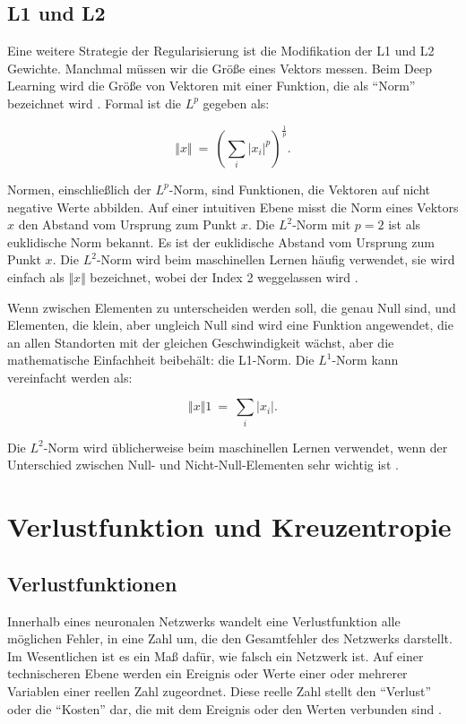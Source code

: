     \subsection{L1 und L2}
    Eine weitere Strategie der Regularisierung ist die Modifikation der L1 und L2 Gewichte. Manchmal müssen wir die Größe eines Vektors messen. Beim Deep Learning wird die Größe von Vektoren mit einer Funktion, die als \enquote{Norm} bezeichnet wird \cite*[39]{IanGoodfellowYoshuaBengio2016}. Formal ist die $L^p$ gegeben als:

    \begin{equation} \label{FormelNorm2}
      \Vert x\Vert \ =\ \left(\sum _{i}\bigr| x_{i}\bigr|^{p}\right)^{\frac{1}{p}}.
    \end{equation}

    Normen, einschließlich der $L^p$-Norm, sind Funktionen, die Vektoren auf nicht negative Werte abbilden. Auf einer intuitiven Ebene misst die Norm eines Vektors $x$ den Abstand vom Ursprung zum Punkt $x$. Die $L^2$-Norm mit $p = 2$ ist als euklidische Norm bekannt. Es ist der euklidische Abstand vom Ursprung zum Punkt $x$. Die $L^2$-Norm wird beim maschinellen Lernen häufig verwendet, sie wird einfach als $\Vert x\Vert$ bezeichnet, wobei der Index 2 weggelassen wird \cite*[39]{IanGoodfellowYoshuaBengio2016}.

    Wenn zwischen Elementen zu unterscheiden werden soll, die genau Null sind, und Elementen, die klein, aber ungleich Null sind wird eine Funktion angewendet, die an allen Standorten mit der gleichen Geschwindigkeit wächst, aber die mathematische Einfachheit beibehält: die L1-Norm. Die $L^1$-Norm kann vereinfacht werden als:

    \begin{equation} \label{FormelNorm1}
      \Vert x\Vert 1\ =\ \sum _{i}\bigr| x_{i}\bigr|.
    \end{equation}

    Die $L^2$-Norm wird üblicherweise beim maschinellen Lernen verwendet, wenn der Unterschied zwischen Null- und Nicht-Null-Elementen sehr wichtig ist \cite*[40]{IanGoodfellowYoshuaBengio2016}.


    \section{Verlustfunktion und Kreuzentropie}
    \subsection{Verlustfunktionen}
    Innerhalb eines neuronalen Netzwerks wandelt eine Verlustfunktion alle möglichen Fehler, in eine Zahl um, die den Gesamtfehler des Netzwerks darstellt. Im Wesentlichen ist es ein Maß dafür, wie falsch ein Netzwerk ist. Auf einer technischeren Ebene werden ein Ereignis oder Werte einer oder mehrerer Variablen einer reellen Zahl zugeordnet. Diese reelle Zahl stellt  den \enquote{Verlust} oder die \enquote{Kosten} dar, die mit dem Ereignis oder den Werten verbunden sind \cite*[61-62]{Taylor2017}.

